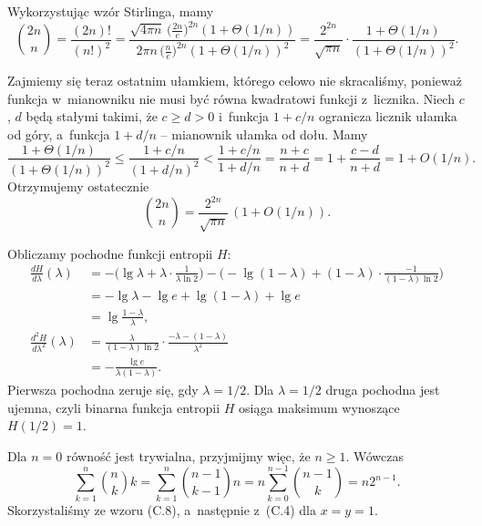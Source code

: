 \exercise %
Wykorzystując wzór Stirlinga, mamy
\[
	\binom{2n}{n} = \frac{(2n)!}{(n!)^2} = \frac{\sqrt{4\pi n}\,\bigl(\frac{2n}{e}\bigr)^{2n}(1+\Theta(1/n))}{2\pi n\,\bigl(\frac{n}{e}\bigr)^{2n}(1+\Theta(1/n))^2} = \frac{2^{2n}}{\sqrt{\pi n}}\cdot\frac{1+\Theta(1/n)}{(1+\Theta(1/n))^2}.
\]

Zajmiemy się teraz ostatnim ułamkiem, którego celowo nie skracaliśmy, ponieważ funkcja w~mianowniku nie musi być równa kwadratowi funkcji z~licznika.
Niech $c$, $d$ będą stałymi takimi, że $c\ge d>0$ i~funkcja $1+c/n$ ogranicza licznik ułamka od góry, a~funkcja $1+d/n$ -- mianownik ułamka od dołu.
Mamy
\[
    \frac{1+\Theta(1/n)}{(1+\Theta(1/n))^2} \le \frac{1+c/n}{(1+d/n)^2} < \frac{1+c/n}{1+d/n} = \frac{n+c}{n+d} = 1+\frac{c-d}{n+d} = 1+O(1/n).
\]
Otrzymujemy ostatecznie
\[
    \binom{2n}{n} = \frac{2^{2n}}{\sqrt{\pi n}}\,(1+O(1/n)).
\]

\exercise %
Obliczamy pochodne funkcji entropii $H$:
\begin{align*}
    \frac{dH}{d\lambda}(\lambda) &= -\biggl(\lg\lambda+\lambda\cdot\frac{1}{\lambda\ln2}\biggr)-\biggl(-\lg(1-\lambda)+(1-\lambda)\cdot\frac{-1}{(1-\lambda)\ln2}\biggr) \\[1mm]
	&= -\lg\lambda-\lg e+\lg(1-\lambda)+\lg e \\[1mm]
	&= \lg\frac{1-\lambda}{\lambda}, \\[1mm]
	\frac{d^2\!H}{d\lambda^2}(\lambda) &= \frac{\lambda}{(1-\lambda)\ln2}\cdot\frac{-\lambda-(1-\lambda)}{\lambda^2} \\[1mm]
	&= -\frac{\lg e}{\lambda(1-\lambda)}.
\end{align*}
Pierwsza pochodna zeruje się, gdy $\lambda=1/2$.
Dla $\lambda=1/2$ druga pochodna jest ujemna, czyli binarna funkcja entropii $H$ osiąga maksimum wynoszące $H(1/2)=1$.

\exercise %
Dla $n=0$ równość jest trywialna, przyjmijmy więc, że $n\ge1$.
Wówczas
\[
	\sum_{k=1}^n\binom{n}{k}k = \sum_{k=1}^n\binom{n-1}{k-1}n = n\sum_{k=0}^{n-1}\binom{n-1}{k} = n2^{n-1}.
\]
Skorzystaliśmy ze wzoru (C.8), a~następnie z~(C.4) dla $x=y=1$.
